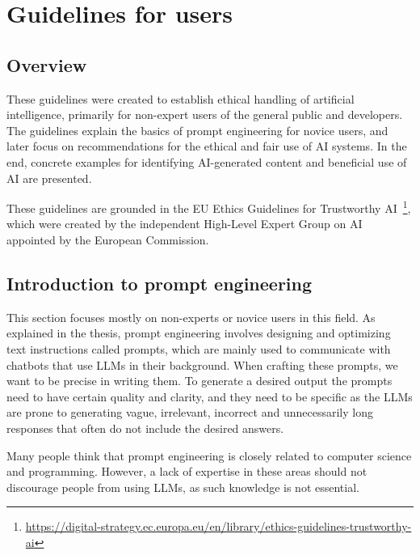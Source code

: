 \setcounter{figure}{0}
\setcounter{table}{0}
\setcounter{section}{0}
\setcounter{listing}{0}

\chapter{Guidelines for users \label{cha:guidelines}}
\renewcommand{\thepage}{B-\arabic{page}}


\minitoc
\clearpage

\section{Overview}
These guidelines were created to establish ethical handling of artificial intelligence, primarily for non-expert users of the general public and developers. The guidelines explain the basics of prompt engineering for novice users, and later focus on recommendations for the ethical and fair use of AI systems. In the end, concrete examples for identifying AI-generated content and beneficial use of AI are presented.

These guidelines are grounded in the EU Ethics Guidelines for Trustworthy AI~\footnote{\url{https://digital-strategy.ec.europa.eu/en/library/ethics-guidelines-trustworthy-ai}}, which were created by the independent High-Level Expert Group on AI appointed by the European Commission.

\section{Introduction to prompt engineering}
This section focuses mostly on non-experts or novice users in this field. As explained in the thesis, prompt engineering involves designing and optimizing text instructions called prompts, which are mainly used to communicate with chatbots that use LLMs in their background. When crafting these prompts, we want to be precise in writing them. To generate a desired output the prompts need to have certain quality and clarity, and they need to be specific as the LLMs are prone to generating vague, irrelevant, incorrect and unnecessarily long responses that often do not include the desired answers.

Many people think that prompt engineering is closely related to computer science and programming. However, a lack of expertise in these areas should not discourage people from using LLMs, as such knowledge is not essential.

